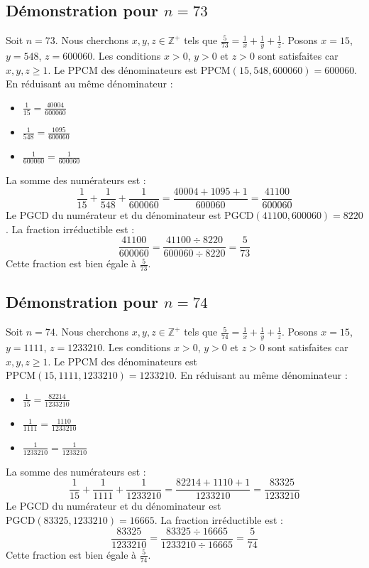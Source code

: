 \documentclass[11pt,a4paper]{article}
\begin{document}
\subsection{Démonstration pour $n = 73$}
Soit $n = 73$. Nous cherchons $x, y, z \in \mathbb{Z}^{+}$ tels que $\frac{5}{73} = \frac{1}{x} + \frac{1}{y} + \frac{1}{z}$.
Posons $x = 15$, $y = 548$, $z = 600060$.
Les conditions $x > 0$, $y > 0$ et $z > 0$ sont satisfaites car $x, y, z \geq 1$.
Le PPCM des dénominateurs est $\text{PPCM}(15, 548, 600060) = 600060$.
En réduisant au même dénominateur :
\begin{itemize}
    \item $\frac{1}{15} = \frac{40004}{600060}$
    \item $\frac{1}{548} = \frac{1095}{600060}$
    \item $\frac{1}{600060} = \frac{1}{600060}$
\end{itemize}
La somme des numérateurs est :
$$ \frac{1}{15} + \frac{1}{548} + \frac{1}{600060} = \frac{40004 + 1095 + 1}{600060} = \frac{41100}{600060} $$
Le PGCD du numérateur et du dénominateur est $\text{PGCD}(41100, 600060) = 8220$.
La fraction irréductible est :
$$ \frac{41100}{600060} = \frac{41100 \div 8220}{600060 \div 8220} = \frac{5}{73} $$
Cette fraction est bien égale à $\frac{5}{73}$.

\subsection{Démonstration pour $n = 74$}
Soit $n = 74$. Nous cherchons $x, y, z \in \mathbb{Z}^{+}$ tels que $\frac{5}{74} = \frac{1}{x} + \frac{1}{y} + \frac{1}{z}$.
Posons $x = 15$, $y = 1111$, $z = 1233210$.
Les conditions $x > 0$, $y > 0$ et $z > 0$ sont satisfaites car $x, y, z \geq 1$.
Le PPCM des dénominateurs est $\text{PPCM}(15, 1111, 1233210) = 1233210$.
En réduisant au même dénominateur :
\begin{itemize}
    \item $\frac{1}{15} = \frac{82214}{1233210}$
    \item $\frac{1}{1111} = \frac{1110}{1233210}$
    \item $\frac{1}{1233210} = \frac{1}{1233210}$
\end{itemize}
La somme des numérateurs est :
$$ \frac{1}{15} + \frac{1}{1111} + \frac{1}{1233210} = \frac{82214 + 1110 + 1}{1233210} = \frac{83325}{1233210} $$
Le PGCD du numérateur et du dénominateur est $\text{PGCD}(83325, 1233210) = 16665$.
La fraction irréductible est :
$$ \frac{83325}{1233210} = \frac{83325 \div 16665}{1233210 \div 16665} = \frac{5}{74} $$
Cette fraction est bien égale à $\frac{5}{74}$.
\end{document}
